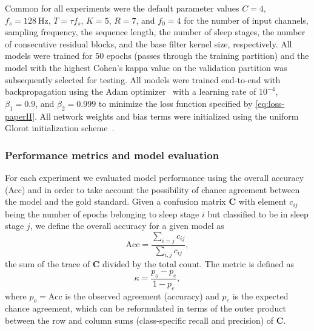 Common for all experiments were the default parameter values $C=4$, $f_s=\SI{128}{\hertz}$, $T=\tau f_s$, $K=5$, $R=7$, and $f_0=4$ for the number of input channels, sampling frequency, the sequence length, the number of sleep stages, the number of consecutive residual blocks, and the base filter kernel size, respectively.
All models were trained for 50 epochs (passes through the training partition) and the model with the highest Cohen’s kappa value on the validation partition was subsequently selected for testing.
All models were trained end-to-end with backpropagation using the Adam optimizer~\cite{Kingma2015} with a learning rate of $10^{-4}$, $\beta_1=0.9$, and $\beta_2=0.999$ to minimize the loss function specified by \cref{eq:loss-paperII}. 
All network weights and bias terms were initialized using the uniform Glorot initialization scheme~\cite{Glorot2010}. 

\subsubsection{Performance metrics and model evaluation}
For each experiment we evaluated model performance using the overall accuracy (Acc) and \cohen in order to take account the possibility of chance agreement between the model and the gold standard.
Given a confusion matrix $\mathbf{C}$ with element $c_{ij}$ being the number of epochs belonging to sleep stage $i$ but classified to be in sleep stage $j$, we define the overall accuracy for a given model as
\begin{equation}
    \text{Acc} = \frac{\sum_{i=j}c_{ij}}{\sum_{i,j}c_{ij}},
\end{equation}
\ie the sum of the trace of $\mathbf{C}$ divided by the total count.
The \cohen metric is defined as
\begin{equation}
    \kappa = \frac{p_o - p_e}{1 - p_e},
\end{equation}
where $p_o = \text{Acc}$ is the observed agreement (\ie accuracy) and $p_e$ is the expected chance agreement, which can be reformulated in terms of the outer product between the row and column sums (class-specific recall and precision) of $\mathbf{C}$.

